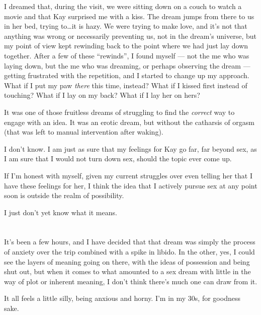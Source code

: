 I dreamed that, during the visit, we were sitting down on a couch to watch a movie and that Kay surprised me with a kiss. The dream jumps from there to us in her bed, trying to\ldots it is hazy. We were trying to make love, and it's not that anything was wrong or necessarily preventing us, not in the dream's universe, but my point of view kept rewinding back to the point where we had just lay down together. After a few of these ``rewinds'', I found myself --- not the me who was laying down, but the me who was dreaming, or perhaps observing the dream --- getting frustrated with the repetition, and I started to change up my approach. What if I put my paw \emph{there} this time, instead? What if I kissed first instead of touching? What if I lay on my back? What if I lay her on hers?

It was one of those fruitless dreams of struggling to find the \emph{correct} way to engage with an idea. It was an erotic dream, but without the catharsis of orgasm (that was left to manual intervention after waking).

I don't know. I am just as sure that my feelings for Kay go far, far beyond sex, as I am sure that I would not turn down sex, should the topic ever come up.

If I'm honest with myself, given my current struggles over even telling her that I have these feelings for her, I think the idea that I actively pursue sex at any point soon is outside the realm of possibility.

I just don't yet know what it means.

\section{}

It's been a few hours, and I have decided that that dream was simply the process of anxiety over the trip combined with a spike in libido. In the other, yes, I could see the layers of meaning going on there, with the ideas of possession and being shut out, but when it comes to what amounted to a sex dream with little in the way of plot or inherent meaning, I don't think there's much one can draw from it.

It all feels a little silly, being anxious and horny. I'm in my 30s, for goodness sake.

\section{}

